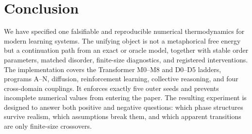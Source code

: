 \section{Conclusion}

We have specified one falsifiable and reproducible numerical thermodynamics for modern
learning systems. The unifying object is not a metaphorical free energy but a continuation
path from an exact or oracle model, together with stable order parameters, matched disorder,
finite-size diagnostics, and registered interventions. The implementation covers the
Transformer M0--M8 and D0--D5 ladders, programs A--N, diffusion, reinforcement learning,
collective reasoning, and four cross-domain couplings. It enforces exactly five outer
seeds and prevents incomplete numerical values from entering the paper. The resulting
experiment is designed to answer both positive and negative questions: which phase
structures survive realism, which assumptions break them, and which apparent transitions
are only finite-size crossovers.
